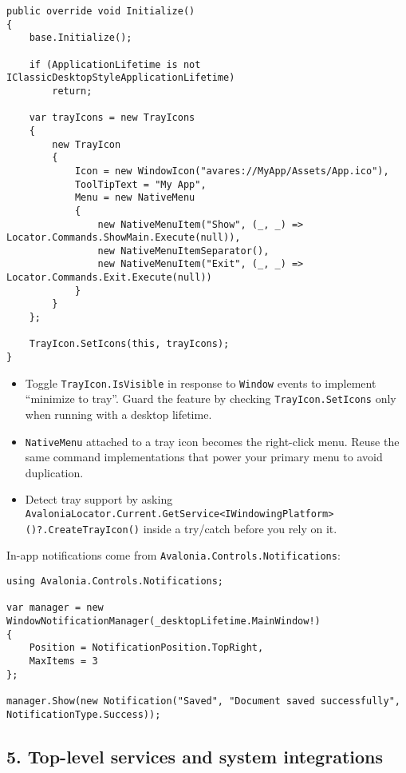 \begin{lstlisting}
public override void Initialize()
{
    base.Initialize();

    if (ApplicationLifetime is not IClassicDesktopStyleApplicationLifetime)
        return;

    var trayIcons = new TrayIcons
    {
        new TrayIcon
        {
            Icon = new WindowIcon("avares://MyApp/Assets/App.ico"),
            ToolTipText = "My App",
            Menu = new NativeMenu
            {
                new NativeMenuItem("Show", (_, _) => Locator.Commands.ShowMain.Execute(null)),
                new NativeMenuItemSeparator(),
                new NativeMenuItem("Exit", (_, _) => Locator.Commands.Exit.Execute(null))
            }
        }
    };

    TrayIcon.SetIcons(this, trayIcons);
}
\end{lstlisting}

\begin{itemize}
\tightlist
\item
  Toggle \passthrough{\lstinline!TrayIcon.IsVisible!} in response to
  \passthrough{\lstinline!Window!} events to implement ``minimize to
  tray''. Guard the feature by checking
  \passthrough{\lstinline!TrayIcon.SetIcons!} only when running with a
  desktop lifetime.
\item
  \passthrough{\lstinline!NativeMenu!} attached to a tray icon becomes
  the right-click menu. Reuse the same command implementations that
  power your primary menu to avoid duplication.
\item
  Detect tray support by asking
  \passthrough{\lstinline!AvaloniaLocator.Current.GetService<IWindowingPlatform>()?.CreateTrayIcon()!}
  inside a try/catch before you rely on it.
\end{itemize}

In-app notifications come from
\passthrough{\lstinline!Avalonia.Controls.Notifications!}:

\begin{lstlisting}
using Avalonia.Controls.Notifications;

var manager = new WindowNotificationManager(_desktopLifetime.MainWindow!)
{
    Position = NotificationPosition.TopRight,
    MaxItems = 3
};

manager.Show(new Notification("Saved", "Document saved successfully", NotificationType.Success));
\end{lstlisting}

\subsection{5. Top-level services and system
integrations}\label{top-level-services-and-system-integrations}

